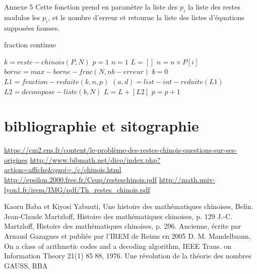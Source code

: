 \documentclass[a4paper, 11pt]{report}
\begin{document}
\begin{appendices}
    Annexe 5
    Cette fonction prend en paramètre la liste des $p_i$ la liste des restes modulos les $p_i$, et le nombre d'erreur et retourne la liste des listes d'équations supposées fausses.
    \begin{algorithm}
        \caption{fraction continue}
        \begin{algorithmic}
            \STATE $k=reste-chinois(P,N)$
            \STATE $p=1$
            \STATE $n=1$
            \STATE $L=[]$
            \STATE $n=n\times P[i]$
            \ENDFOR
            \STATE $borne=max-borne-frac(N,nb-erreur)$
            \STATE $b=0$
            \STATE $L1= fraction-reduite(k,n,p)$
            \STATE $(a,d)=list-int-reduite(L1)$
            \STATE $L2=decompose-liste(b,N)$
            \STATE $L=L+[L2]$
            \ENDIF
            \STATE $p=p+1$
            \ENDWHILE
        \end{algorithmic}
    \end{algorithm}
\end{appendices}
\newpage

\chapter*{bibliographie et sitographie}
\url{https://cm2.ens.fr/content/le-problème-des-restes-chinois-questions-sur-ses-origines}
\url{http://www.bibmath.net/dico/index.php?action=affiche&quoi=./c/chinois.html}
\url{http://epsilon.2000.free.fr/Csup/resteschinois.pdf}
\url{http://math.univ-lyon1.fr/irem/IMG/pdf/Th_restes_chinois.pdf}

\vspace{5cm}

Kaoru Baba et Kiyosi Yabuuti, Une histoire des mathématiques chinoises, Belin. \newline
Jean-Claude Martzloff, Histoire des mathématiques chinoises, p. 129 \newline
J.-C. Martzloff, Histoire des mathématiques chinoises, p. 296. \newline
Ancienne, écrite par Arnaud Gazagnes et publiée par l’IREM de Reims en 2005 \newline
D. M. Mandelbaum, On a class of arithmetic codes and a decoding algorithm, IEEE Trans. on Information Theory 21(1) 85􏰀88, 1976. \newline
Une révolution de la théorie des nombres GAUSS, RBA \newline
\newline 
\end{document}
